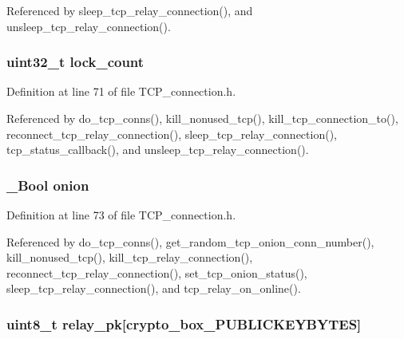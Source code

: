 Referenced by sleep\+\_\+tcp\+\_\+relay\+\_\+connection(), and unsleep\+\_\+tcp\+\_\+relay\+\_\+connection().

\hypertarget{struct_t_c_p__con_af2d7f68891e20ea9070cfc2d412867e1}{
\subsubsection[{lock\+\_\+count}]{\setlength{\rightskip}{0pt plus 5cm}uint32\+\_\+t lock\+\_\+count}}\label{struct_t_c_p__con_af2d7f68891e20ea9070cfc2d412867e1}


Definition at line 71 of file T\+C\+P\+\_\+connection.\+h.



Referenced by do\+\_\+tcp\+\_\+conns(), kill\+\_\+nonused\+\_\+tcp(), kill\+\_\+tcp\+\_\+connection\+\_\+to(), reconnect\+\_\+tcp\+\_\+relay\+\_\+connection(), sleep\+\_\+tcp\+\_\+relay\+\_\+connection(), tcp\+\_\+status\+\_\+callback(), and unsleep\+\_\+tcp\+\_\+relay\+\_\+connection().

\hypertarget{struct_t_c_p__con_a4f1449619f7a2b76af07277f10bd0f93}{
\subsubsection[{onion}]{\setlength{\rightskip}{0pt plus 5cm}\+\_\+\+Bool onion}}\label{struct_t_c_p__con_a4f1449619f7a2b76af07277f10bd0f93}


Definition at line 73 of file T\+C\+P\+\_\+connection.\+h.



Referenced by do\+\_\+tcp\+\_\+conns(), get\+\_\+random\+\_\+tcp\+\_\+onion\+\_\+conn\+\_\+number(), kill\+\_\+nonused\+\_\+tcp(), kill\+\_\+tcp\+\_\+relay\+\_\+connection(), reconnect\+\_\+tcp\+\_\+relay\+\_\+connection(), set\+\_\+tcp\+\_\+onion\+\_\+status(), sleep\+\_\+tcp\+\_\+relay\+\_\+connection(), and tcp\+\_\+relay\+\_\+on\+\_\+online().

\hypertarget{struct_t_c_p__con_afd26506e572bfd335a3e7b498acd2902}{
\subsubsection[{relay\+\_\+pk}]{\setlength{\rightskip}{0pt plus 5cm}uint8\+\_\+t relay\+\_\+pk\mbox{[}crypto\+\_\+box\+\_\+\+P\+U\+B\+L\+I\+C\+K\+E\+Y\+B\+Y\+T\+E\+S\mbox{]}}}\label{struct_t_c_p__con_afd26506e572bfd335a3e7b498acd2902}


